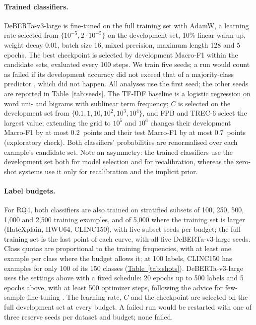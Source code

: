 \paragraph{Trained classifiers.}
DeBERTa-v3-large \citep{he2023debertav3} is fine-tuned on the full training set with AdamW, a learning rate selected
from $\{10^{-5}, 2\cdot10^{-5}\}$ on the development set, 10\% linear warm-up, weight decay 0.01, batch size 16, mixed
precision, maximum length 128 and 5 epochs. The best checkpoint is selected by development Macro-F1 within the candidate
sets, evaluated every 100 steps. We train five seeds; a run would count as failed if its development accuracy did not
exceed that of a majority-class predictor \citep{dodge2020finetuning,mosbach2021stability}, which did not happen. All analyses use the first
seed; the other seeds are reported in \hyperref[tab:seeds]{Table~\ref*{tab:seeds}}. The TF-IDF baseline is a logistic regression on word
uni- and bigrams with sublinear term frequency; $C$ is selected on the development set from
$\{0.1, 1, 10, 10^2, 10^3, 10^4\}$, and FPB and TREC-6 select the largest value; extending the grid to $10^5$ and
$10^6$ changes their development Macro-F1 by at most 0.2~points and their test Macro-F1 by at most 0.7~points
(exploratory check). Both classifiers' probabilities are
renormalised over each example's candidate set. Note an asymmetry: the trained classifiers use the development set both
for model selection and for recalibration, whereas the zero-shot systems use it only for recalibration and the implicit
prior.

\paragraph{Label budgets.}
For RQ4, both classifiers are also trained on stratified subsets of 100, 250, 500, 1{,}000 and 2{,}500 training
examples, and of 5{,}000 where the training set is larger (HateXplain, HWU64, CLINC150), with five subset seeds per
budget; the full training set is the last point of each curve, with all five DeBERTa-v3-large seeds. Class quotas are
proportional to the training frequencies, with at least one example per class where the budget allows it; at 100
labels, CLINC150 has examples for only 100 of its 150 classes (\hyperref[tab:shots]{Table~\ref*{tab:shots}}).
DeBERTa-v3-large uses the settings above with a fixed schedule: 20 epochs up to 500 labels and 5 epochs above, with at
least 500 optimizer steps, following the advice for few-sample fine-tuning
\citep{mosbach2021stability,zhang2021revisiting}. The learning rate, $C$ and the checkpoint are selected on the full
development set at every budget. A failed run would be restarted with one of three reserve seeds per dataset and
budget; none failed.

